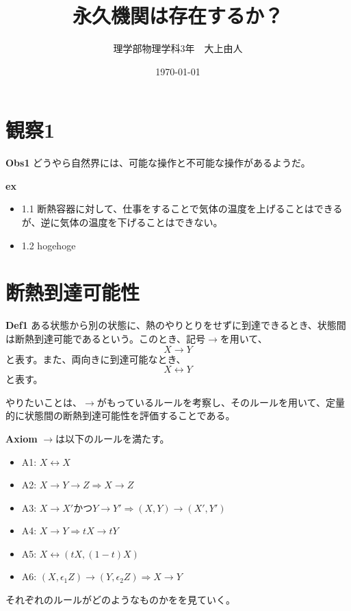 \documentclass[a3paper, twocolumn, 11pt]{jsarticle}
\title{永久機関は存在するか？} %
\author{理学部物理学科3年　大上由人} %
\date{\today} %
\begin{document}
 
 
\maketitle %
 
\setlength{\columnseprule}{0.1pt} %
 
\section{観察1}
\begin{itembox}[l]{\textbf{Obs1}}
    どうやら自然界には、可能な操作と不可能な操作があるようだ。
\end{itembox}
\textbf{ex}
\begin{itemize}
    \item 1.1 断熱容器に対して、仕事をすることで気体の温度を上げることはできるが、逆に気体の温度を下げることはできない。
    \item 1.2 hogehoge
\end{itemize}

\section{断熱到達可能性}
\begin{itembox}[l]{\textbf{Def1}}
    ある状態から別の状態に、熱のやりとりをせずに到達できるとき、状態間は断熱到達可能であるという。このとき、記号$\rightarrow$を用いて、
    \begin{equation}
        X \rightarrow Y
    \end{equation}
    と表す。また、両向きに到達可能なとき、
    \begin{equation}
        X \leftrightarrow Y
    \end{equation}
    と表す。
\end{itembox}

やりたいことは、$\rightarrow$がもっているルールを考察し、そのルールを用いて、定量的に状態間の断熱到達可能性を評価することである。

\begin{itembox}[l]{\textbf{Axiom}}
    $\rightarrow$は以下のルールを満たす。
    \begin{itemize}
        \item A1: $ X \leftrightarrow X$
        \item A2: $ X \rightarrow Y \rightarrow Z \Rightarrow X \rightarrow Z$
        \item A3: $ X \rightarrow X'$かつ$Y \rightarrow Y' \Rightarrow (X,Y) \rightarrow (X',Y')$
        \item A4: $ X \rightarrow Y \Rightarrow tX \rightarrow tY$
        \item A5: $ X \leftrightarrow (tX,(1-t)X)$
        \item A6: $ (X,\epsilon_1 Z) \rightarrow (Y,\epsilon_2 Z) \Rightarrow X \rightarrow Y$
        \end{itemize}
\end{itembox}
それぞれのルールがどのようなものかをを見ていく。\\
\end{document}

